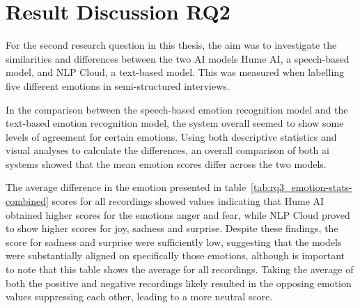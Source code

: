 
\section{Result Discussion RQ2}
For the second research question in this thesis, the aim was to investigate the similarities and differences between the two AI models Hume AI, a speech-based model, and NLP Cloud, a text-based model. This was measured when labelling five different emotions in semi-structured interviews.

\label{subsec:RQ2interpretation}
In the comparison between the speech-based emotion recognition model and the text-based emotion recognition model, the system overall seemed to show some levels of agreement for certain emotions. Using both descriptive statistics and visual analyses to calculate the differences, an overall comparison of both ai systems showed that the mean emotion scores differ across the two models.

The average difference in the emotion presented in table~\ref{tab:rq3_emotion-stats-combined} scores for all recordings showed values indicating that Hume AI obtained higher scores for the emotions anger and fear, while NLP Cloud proved to show higher scores for joy, sadness and surprise. Despite these findings, the score for sadness and surprise were sufficiently low, suggesting that the models were substantially aligned on specifically those emotions, although is important to note that this table shows the average for all recordings. Taking the average of both the positive and negative recordings likely resulted in the opposing emotion values suppressing each other, leading to a more neutral score.

